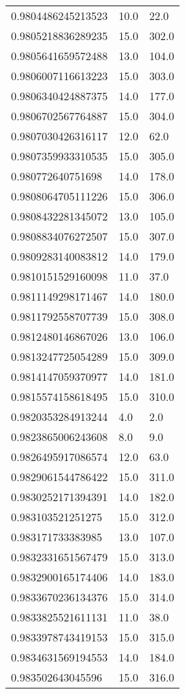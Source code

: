\begin{center}
\begin{supertabular}[H]{p{0.30\textwidth}p{0.05\textwidth}p{0.05\textwidth}}
0.9804486245213523 & 10.0 & 22.0 \\ 
0.9805218836289235 & 15.0 & 302.0 \\ 
0.9805641659572488 & 13.0 & 104.0 \\ 
0.9806007116613223 & 15.0 & 303.0 \\ 
0.9806340424887375 & 14.0 & 177.0 \\ 
0.9806702567764887 & 15.0 & 304.0 \\ 
0.9807030426316117 & 12.0 & 62.0 \\ 
0.9807359933310535 & 15.0 & 305.0 \\ 
0.980772640751698 & 14.0 & 178.0 \\ 
0.9808064705111226 & 15.0 & 306.0 \\ 
0.9808432281345072 & 13.0 & 105.0 \\ 
0.9808834076272507 & 15.0 & 307.0 \\ 
0.9809283140083812 & 14.0 & 179.0 \\ 
0.9810151529160098 & 11.0 & 37.0 \\ 
0.9811149298171467 & 14.0 & 180.0 \\ 
0.9811792558707739 & 15.0 & 308.0 \\ 
0.9812480146867026 & 13.0 & 106.0 \\ 
0.9813247725054289 & 15.0 & 309.0 \\ 
0.9814147059370977 & 14.0 & 181.0 \\ 
0.9815574158618495 & 15.0 & 310.0 \\ 
0.9820353284913244 & 4.0 & 2.0 \\ 
0.9823865006243608 & 8.0 & 9.0 \\ 
0.9826495917086574 & 12.0 & 63.0 \\ 
0.9829061544786422 & 15.0 & 311.0 \\ 
0.9830252171394391 & 14.0 & 182.0 \\ 
0.983103521251275 & 15.0 & 312.0 \\ 
0.983171733383985 & 13.0 & 107.0 \\ 
0.9832331651567479 & 15.0 & 313.0 \\ 
0.9832900165174406 & 14.0 & 183.0 \\ 
0.9833670236134376 & 15.0 & 314.0 \\ 
0.9833825521611131 & 11.0 & 38.0 \\ 
0.9833978743419153 & 15.0 & 315.0 \\ 
0.9834631569194553 & 14.0 & 184.0 \\ 
0.983502643045596 & 15.0 & 316.0 \\ 

\end{supertabular}
\end{center}
